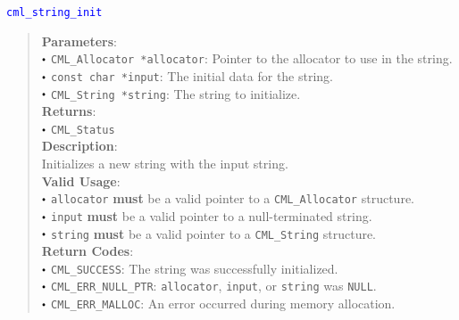 \documentclass[a4paper,oneside,8pt]{extarticle}
\newcommand{\function}[1]{
  \noindent\textcolor{blue}{\texttt{#1}}
  \vspace{-0.3em}
}
\renewcommand{\dot}{\raisebox{0.3ex}{\scalebox{0.6}{$\bullet$}}}
\theoremstyle{definition}
\begin{document}
\function{cml\_string\_init}
\begin{quote}
  \textbf{Parameters}: \\
  $\dot$ \texttt{CML\_Allocator *allocator}: Pointer to the allocator to use in the string. \\
  $\dot$ \texttt{const char *input}: The initial data for the string. \\
  $\dot$ \texttt{CML\_String *string}: The string to initialize. \\
  \textbf{Returns}: \\
  $\dot$ \texttt{CML\_Status} \\
  
  \vspace{-0.75em}
  \textbf{Description}: \\
  Initializes a new string with the input string. \\

  \vspace{-0.75em}
  \textbf{Valid Usage}: \\
  $\dot$ \texttt{allocator} \textbf{must} be a valid pointer to a \texttt{CML\_Allocator} structure. \\
  $\dot$ \texttt{input} \textbf{must} be a valid pointer to a null-terminated string. \\
  $\dot$ \texttt{string} \textbf{must} be a valid pointer to a \texttt{CML\_String} structure. \\

  \vspace{-0.75em}
  \textbf{Return Codes}: \\
  $\dot$ \texttt{CML\_SUCCESS}: The string was successfully initialized. \\
  $\dot$ \texttt{CML\_ERR\_NULL\_PTR}: \texttt{allocator}, \texttt{input}, or \texttt{string} was \texttt{NULL}. \\
  $\dot$ \texttt{CML\_ERR\_MALLOC}: An error occurred during memory allocation. \\
\end{quote}
\end{document}
